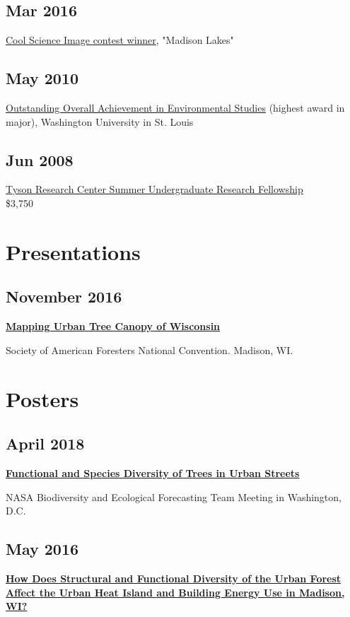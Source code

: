 \documentclass[11pt, sans]{moderncv}
\begin{document}
\subsection*{Mar 2016}
\label{sec:org8dc2483}
\href{http://news.wisc.edu/cool-science-images-2016/\#\&gid=1\&pid=10}{Cool Science Image contest winner}, "Madison Lakes" \\

\subsection*{May  2010}
\label{sec:org0e41915}
\href{http://enst.wustl.edu/program/awards}{Outstanding Overall Achievement in Environmental Studies} (highest
award in major), Washington University in St. Louis

\subsection*{Jun 2008}
\label{sec:org83b5d93}
\href{https://tyson.wustl.edu/2008}{Tyson Research Center Summer Undergraduate Research Fellowship} \\
 \$3,750

\section*{Presentations}
\label{sec:org904cb03}
\subsection*{November 2016}
\label{sec:org0da9e2d}
\textbf{\href{http://pages.stat.wisc.edu/\~erker/Presentations/SAF\_20161105/saf\_presentation.html}{Mapping Urban Tree Canopy of Wisconsin}}

Society of American Foresters National Convention. Madison, WI.
\section*{Posters}
\label{sec:orge6c083e}
\subsection*{April 2018}
\label{sec:org779306b}
\textbf{\href{http://pages.stat.wisc.edu/\~erker/Posters/NASA\_poster\_2018.jpg}{Functional and Species Diversity of Trees in Urban Streets}}

NASA Biodiversity and Ecological Forecasting Team Meeting in
Washington, D.C.
\subsection*{May 2016}
\label{sec:org1001e99}
\textbf{\href{http://pages.stat.wisc.edu/\~erker/Posters/NASA\_poster\_2016.jp2}{How Does Structural and Functional Diversity of the Urban Forest
Affect the Urban Heat Island and Building Energy Use in Madison, WI?}}
\end{document}
